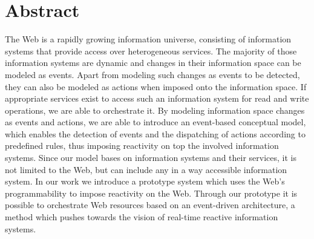 \chapter*{Abstract}

The Web is a rapidly growing information universe, consisting of information systems that provide access over heterogeneous services.
The majority of those information systems are dynamic and changes in their information space can be modeled as events.
Apart from modeling such changes as events to be detected, they can also be modeled as actions when imposed onto the information space.
If appropriate services exist to access such an information system for read and write operations, we are able to orchestrate it.
By modeling information space changes as events and actions, we are able to introduce an event-based conceptual model, which enables the detection of events and the dispatching of actions according to predefined rules, thus imposing reactivity on top the involved information systems.
Since our model bases on information systems and their services, it is not limited to the Web, but can include any in a way accessible information system.
In our work we introduce a prototype system which uses the Web's programmability to impose reactivity on the Web.
Through our prototype it is possible to orchestrate Web resources based on an event-driven architecture, a method which pushes towards the vision of real-time reactive information systems.

